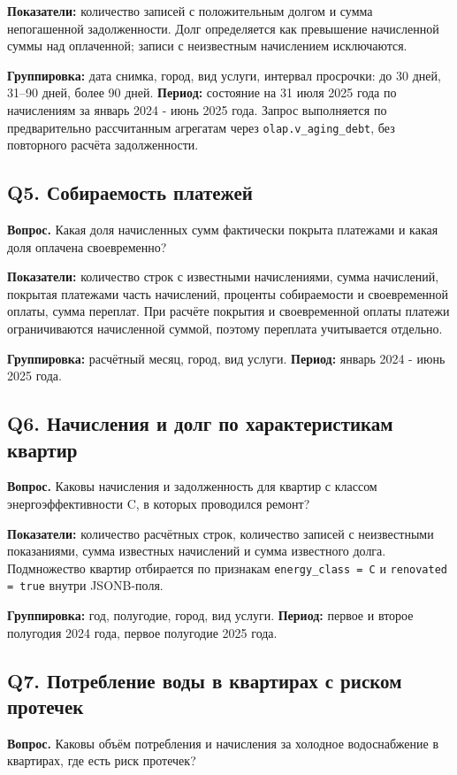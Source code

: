 \documentclass[12pt]{article}
\begin{document}
\textbf{Показатели:} количество записей с положительным долгом и сумма непогашенной задолженности. Долг определяется как превышение начисленной суммы над оплаченной; записи с неизвестным начислением исключаются.

\textbf{Группировка:} дата снимка, город, вид услуги, интервал просрочки: до 30 дней, 31--90 дней, более 90 дней. \textbf{Период:} состояние на 31 июля 2025 года по начислениям за январь 2024 - июнь 2025 года. Запрос выполняется по предварительно рассчитанным агрегатам через \texttt{olap.v\_aging\_debt}, без повторного расчёта задолженности.

\subsection{Q5. Собираемость платежей}
\textbf{Вопрос.} Какая доля начисленных сумм фактически покрыта платежами и какая доля оплачена своевременно?

\textbf{Показатели:} количество строк с известными начислениями, сумма начислений, покрытая платежами часть начислений, проценты собираемости и своевременной оплаты, сумма переплат. При расчёте покрытия и своевременной оплаты платежи ограничиваются начисленной суммой, поэтому переплата учитывается отдельно.

\textbf{Группировка:} расчётный месяц, город, вид услуги. \textbf{Период:} январь 2024 - июнь 2025 года.

\subsection{Q6. Начисления и долг по характеристикам квартир}
\textbf{Вопрос.} Каковы начисления и задолженность для квартир с классом энергоэффективности C, в которых проводился ремонт?

\textbf{Показатели:} количество расчётных строк, количество записей с неизвестными показаниями, сумма известных начислений и сумма известного долга. Подмножество квартир отбирается по признакам \texttt{energy\_class = C} и \texttt{renovated = true} внутри JSONB-поля.

\textbf{Группировка:} год, полугодие, город, вид услуги. \textbf{Период:} первое и второе полугодия 2024 года, первое полугодие 2025 года.

\subsection{Q7. Потребление воды в квартирах с риском протечек}
\textbf{Вопрос.} Каковы объём потребления и начисления за холодное водоснабжение в квартирах, где есть риск протечек?
\end{document}
